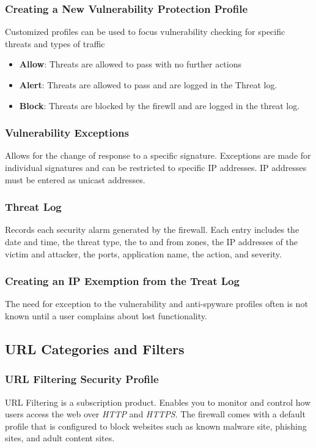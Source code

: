 \subsubsection{Creating a New Vulnerability Protection Profile}
Customized profiles can be used to focus vulnerability checking for specific threats and types of traffic
	\begin{itemize}
		\item \textbf{Allow}: Threats are allowed to pass with no further actions
		\item \textbf{Alert}: Threats are allowed to pass and are logged in the Threat log.
		\item \textbf{Block}: Threats are blocked by the firewll and are logged in the threat log.
	\end{itemize}

\subsubsection{Vulnerability Exceptions}
Allows for the change of response to a specific signature. 
Exceptions are made for individual signatures and can be restricted to specific IP addresses.
IP addresses must be entered as unicast addresses.

\subsubsection{Threat Log}
Records each security alarm generated by the firewall. 
Each entry includes the date and time, the threat type, the to and from zones, the IP addresses of the victim and attacker, the ports, application name, the action, and severity.

\subsubsection{Creating an IP Exemption from the Treat Log}
The need for exception to the vulnerability and anti-spyware profiles often is not known until a user complains about lost functionality.


\subsection{URL Categories and Filters}
\subsubsection{URL Filtering Security Profile}
URL Filtering is a subscription product. Enables you to monitor and control how users access the web over \textit{HTTP} and \textit{HTTPS}.
The firewall comes with a default profile that is configured to block websites such as known malware site, phishing sites, and adult content sites.


